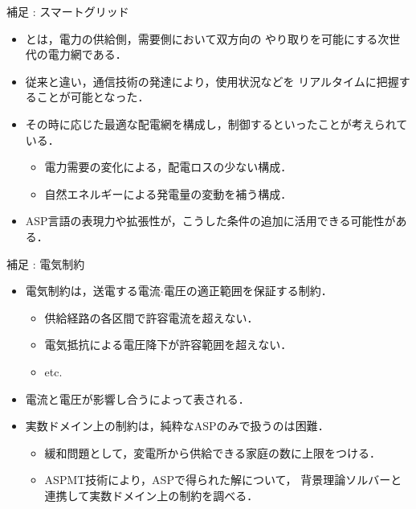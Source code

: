 \documentclass[dvipdfmx,11pt]{beamer}
\begin{document}
\begin{frame}{補足 : スマートグリッド}
 \begin{itemize}
  \item {}とは，電力の供給側，需要側において双方向の
		やり取りを可能にする次世代の電力網である．
  \item 従来と違い，通信技術の発達により，使用状況などを
		リアルタイムに把握することが可能となった．
  \item その時に応じた最適な配電網を構成し，制御するといったことが考えられている．
		\begin{itemize}
		 \item 電力需要の変化による，配電ロスの少ない構成．
		 \item 自然エネルギーによる発電量の変動を補う構成．
		\end{itemize}
  \item ASP言語の表現力や拡張性が，こうした条件の追加に活用できる可能性がある．
 \end{itemize}
\end{frame}

\begin{frame}{補足 : 電気制約}
 \begin{itemize}
  \item \alert{電気制約}は，送電する電流$\cdot$電圧の適正範囲を保証する制約．
  \begin{itemize}
   \item 供給経路の各区間で許容電流を超えない．
   \item 電気抵抗による電圧降下が許容範囲を超えない．
   \item etc.
  \end{itemize}
  \item 電流と電圧が影響し合うによって表される．
  \item 実数ドメイン上の制約は，純粋なASPのみで扱うのは\alert{困難}．
		\begin{itemize}
		 \item 緩和問題として，変電所から供給できる家庭の数に上限をつける．
		 \item ASPMT技術により，ASPで得られた解について，
			   背景理論ソルバーと連携して実数ドメイン上の制約を調べる．
		\end{itemize}
 \end{itemize}
\end{frame}
\end{document}
